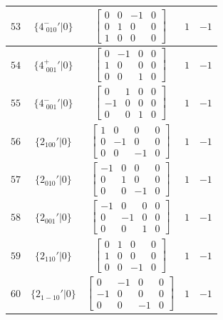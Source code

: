 \documentclass[fleqn,8pt]{jsarticle}
\begin{document}
\begin{longtable}{ccccc}
$ 53 $ & $ \{4^{-}_{\,\,010}{}'|0\} $ & $ \begin{bmatrix} 0 & 0 & -1 & 0 \\ 0 & 1 & 0 & 0 \\ 1 & 0 & 0 & 0 \end{bmatrix} $ & $ 1 $ & $ -1 $ \\ \hline
$ 54 $ & $ \{4^{+}_{\,\,001}{}'|0\} $ & $ \begin{bmatrix} 0 & -1 & 0 & 0 \\ 1 & 0 & 0 & 0 \\ 0 & 0 & 1 & 0 \end{bmatrix} $ & $ 1 $ & $ -1 $ \\ \hline
$ 55 $ & $ \{4^{-}_{\,\,001}{}'|0\} $ & $ \begin{bmatrix} 0 & 1 & 0 & 0 \\ -1 & 0 & 0 & 0 \\ 0 & 0 & 1 & 0 \end{bmatrix} $ & $ 1 $ & $ -1 $ \\ \hline
$ 56 $ & $ \{2{}_{100}{}'|0\} $ & $ \begin{bmatrix} 1 & 0 & 0 & 0 \\ 0 & -1 & 0 & 0 \\ 0 & 0 & -1 & 0 \end{bmatrix} $ & $ 1 $ & $ -1 $ \\ \hline
$ 57 $ & $ \{2{}_{010}{}'|0\} $ & $ \begin{bmatrix} -1 & 0 & 0 & 0 \\ 0 & 1 & 0 & 0 \\ 0 & 0 & -1 & 0 \end{bmatrix} $ & $ 1 $ & $ -1 $ \\ \hline
$ 58 $ & $ \{2{}_{001}{}'|0\} $ & $ \begin{bmatrix} -1 & 0 & 0 & 0 \\ 0 & -1 & 0 & 0 \\ 0 & 0 & 1 & 0 \end{bmatrix} $ & $ 1 $ & $ -1 $ \\ \hline
$ 59 $ & $ \{2{}_{110}{}'|0\} $ & $ \begin{bmatrix} 0 & 1 & 0 & 0 \\ 1 & 0 & 0 & 0 \\ 0 & 0 & -1 & 0 \end{bmatrix} $ & $ 1 $ & $ -1 $ \\ \hline
$ 60 $ & $ \{2{}_{1-10}{}'|0\} $ & $ \begin{bmatrix} 0 & -1 & 0 & 0 \\ -1 & 0 & 0 & 0 \\ 0 & 0 & -1 & 0 \end{bmatrix} $ & $ 1 $ & $ -1 $ \\ \hline

\end{longtable}
\end{document}
